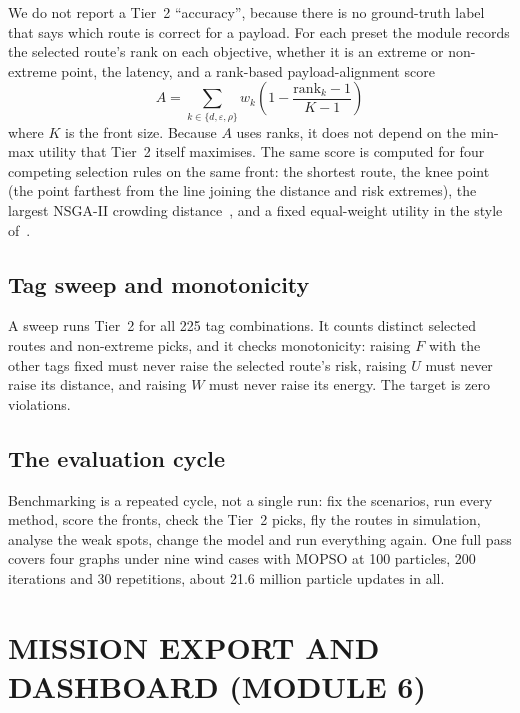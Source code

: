We do not report a Tier~2 ``accuracy'', because there is no ground-truth label that
says which route is correct for a payload. For each preset the module records the
selected route's rank on each objective, whether it is an extreme or non-extreme point,
the latency, and a rank-based payload-alignment score
\begin{equation}
  A = \sum_{k \in \{d, \varepsilon, \rho\}} w_k\left(1 - \frac{\mathrm{rank}_k - 1}{K - 1}\right)
\end{equation}
where $K$ is the front size. Because $A$ uses ranks, it does not depend on the min-max
utility that Tier~2 itself maximises. The same score is computed for four competing
selection rules on the same front: the shortest route, the knee point (the point
farthest from the line joining the distance and risk extremes), the largest NSGA-II
crowding distance~\cite{r8,r3}, and a fixed equal-weight utility in the style
of~\cite{r1}.

\subsection{Tag sweep and monotonicity}

A sweep runs Tier~2 for all 225 tag combinations. It counts distinct selected routes
and non-extreme picks, and it checks monotonicity: raising $F$ with the other tags
fixed must never raise the selected route's risk, raising $U$ must never raise its
distance, and raising $W$ must never raise its energy. The target is zero violations.

\subsection{The evaluation cycle}

Benchmarking is a repeated cycle, not a single run: fix the scenarios, run every method,
score the fronts, check the Tier~2 picks, fly the routes in simulation, analyse the weak
spots, change the model and run everything again. One full pass covers four graphs
under nine wind cases with MOPSO at 100 particles, 200 iterations and 30 repetitions,
about 21.6 million particle updates in all.

\section{MISSION EXPORT AND DASHBOARD (MODULE 6)}\label{sec:m6}

